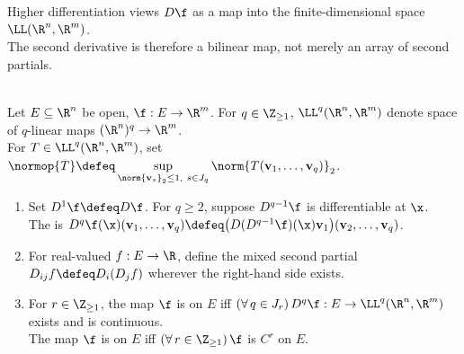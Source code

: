 Higher differentiation views $D\f$ as a map into the finite-dimensional space $\LL(\R^n,\R^m)$.\\
The second derivative is therefore a bilinear map, not merely an array of second partials.

\begin{definition} \label{def:higher-order-partials-and-c2} \\
Let $E\subseteq\R^n$ be open, $\f:E\to\R^m$. For $q\in\Z_{\geq1}$, $\LL^q(\R^n,\R^m)$ denote space of $q$-linear maps $(\R^n)^q\to\R^m$.\\
For $T\in\LL^q(\R^n,\R^m)$, set $\normop{T}\defeq\sup\limits_{\norm{\mathbf v_s}_2\leq1,\ s\in J_q} \norm{T(\mathbf v_1,\ldots,\mathbf v_q)}_2$.
\begin{enumerate}[label=(\roman*)]
\setlength{\itemsep}{0pt}
\item Set $D^1\f\defeq D\f$. For $q\geq2$, suppose $D^{q-1}\f$ is differentiable at $\x$.\\
The  is $D^q\f(\x)(\mathbf v_1,\ldots,\mathbf v_q)\defeq\bigl(D(D^{q-1}\f)(\x)\mathbf v_1\bigr)(\mathbf v_2,\ldots,\mathbf v_q)$.
\item For real-valued $f:E\to\R$, define the mixed second partial $D_{ij}f\defeq D_i(D_jf)$ wherever the right-hand side exists.
\item For $r\in\Z_{\geq1}$, the map $\f$ is  on $E$ iff $(\forall\,q\in J_r)\,D^q\f:E\to\LL^q(\R^n,\R^m)$ exists and is continuous.\\
The map $\f$ is  on $E$ iff $(\forall\,r\in\Z_{\geq1})\,\f$ is $C^r$ on $E$.
\end{enumerate}
\end{definition}

